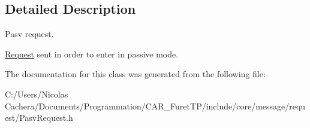 \subsection{Detailed Description}
Pasv request. 

\hyperlink{classFTP_1_1Request}{Request} sent in order to enter in passive mode. 

The documentation for this class was generated from the following file\+:\begin{DoxyCompactItemize}
\item 
C\+:/\+Users/\+Nicolas Cachera/\+Documents/\+Programmation/\+C\+A\+R\+\_\+\+Furet\+T\+P/include/core/message/request/Pasv\+Request.\+h\end{DoxyCompactItemize}
